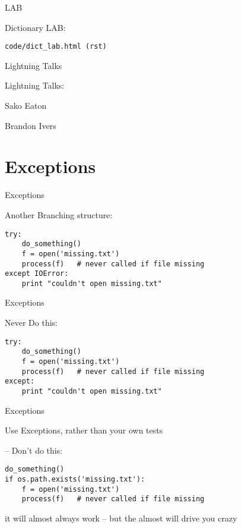 \documentclass{beamer}
\begin{document}
\begin{frame}[fragile]{LAB}

\vfill
{\Large Dictionary LAB:}

\vfill
{\large \verb|code/dict_lab.html (rst) |}

\vfill
\end{frame}


\begin{frame}{Lightning Talks}

{\LARGE Lightning Talks:}

\vfill
{\Large
 Sako Eaton

\vfill
Brandon Ivers
}
\vfill

\end{frame}

\section{Exceptions}

\begin{frame}[fragile]{Exceptions}

{\Large Another Branching structure:}
\vfill
\begin{verbatim}
try:
    do_something()
    f = open('missing.txt')
    process(f)   # never called if file missing
except IOError:
    print "couldn't open missing.txt"
\end{verbatim}
\vfill
\end{frame}

\begin{frame}[fragile]{Exceptions}

{\Large Never Do this:}
\vfill
\begin{verbatim}
try:
    do_something()
    f = open('missing.txt')
    process(f)   # never called if file missing
except:
    print "couldn't open missing.txt"
\end{verbatim}
\vfill
\end{frame}

\begin{frame}[fragile]{Exceptions}

{\Large Use Exceptions, rather than your own tests

 \hspace{0.1in} -- Don't do this:}

\vfill
\begin{verbatim}
do_something()
if os.path.exists('missing.txt'):
    f = open('missing.txt')
    process(f)   # never called if file missing
\end{verbatim}
\vfill
it will almost always work -- but the almost will drive you crazy
\end{frame}
\end{document}
